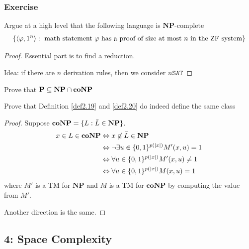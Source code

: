 \documentclass[11pt]{article}
\def \NP {\textbf{NP}}
\def \coNP {\textbf{coNP}}
\def \SAT {\text{SAT}}
\def \NP {\textbf{NP}}
\def \SAT {\texttt{SAT}}
\begin{document}
\subsubsection{Exercise}
\label{sec:org4dd950b}
\begin{exercise}
\label{ex2.11}
Argue at a high level that the following language is \(\NP\)-complete
     \begin{equation*}
\left\{\langle\varphi,1^n\rangle:\text{ math statement }\varphi
\text{ has a proof of size at most $n$ in the ZF system}
\right\}
     \end{equation*}
\end{exercise}

\begin{proof}
Essential part is to find a reduction.

Idea: if there are \(n\) derivation rules, then we consider \(n\SAT\)
\end{proof}

\begin{exercise}
\label{ex2.23}
Prove that \(\bP\subseteq\NP\cap\coNP\)
\end{exercise}

\begin{exercise}
\label{ex2.24}
Prove that Definition \ref{def2.19} and \ref{def2.20} do indeed define the same class
\end{exercise}

\begin{proof}
Suppose \(\coNP=\{L:\barL\in\NP\}\).
     \begin{align*}
x\in L\in\coNP& \Leftrightarrow x\not\in\barL\in\NP\\
& \Leftrightarrow\neg\exists u\in\{0,1\}^{p(\abs{x})} M'(x,u)=1\\
&\Leftrightarrow\forall u\in\{0,1\}^{p(\abs{x})}M'(x,u)\neq1\\
&\Leftrightarrow\forall u\in\{0,1\}^{p(\abs{x})}M(x,u)=1\\
     \end{align*}
where \(M'\) is a TM for \(\NP\) and \(M\) is a TM for \(\coNP\) by computing the value
from \(M'\).

Another direction is the same.
\end{proof}

\subsection{4: Space Complexity}
\label{sec:orge4d1315}
\end{document}
